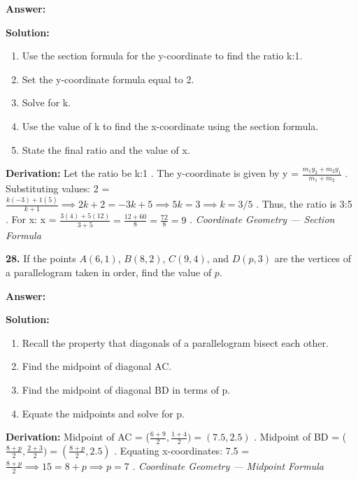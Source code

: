 \documentclass[12pt,a4paper]{exam}
\newcommand{\fitmath}[1]{%
  \sbox{\schmathbox}{$\displaystyle #1$}%
  \ifdim\wd\schmathbox>\linewidth
    \resizebox{\linewidth}{!}{\usebox{\schmathbox}}%
  \else
    \usebox{\schmathbox}%
  \fi}
\begin{document}
\begin{questions}
\textbf{Answer:}
\begin{center}
\fitmath{\text{Ratio is} 3:5, x = 9}
\end{center}

\textbf{Solution:}
\begin{enumerate}
  \item Use the section formula for the y-coordinate to find the ratio k:1.
  \item Set the y-coordinate formula equal to 2.
  \item Solve for k.
  \item Use the value of k to find the x-coordinate using the section formula.
  \item State the final ratio and the value of x.
\end{enumerate}
\textbf{Derivation:}
Let the ratio be  k:1 . The y-coordinate is given by  y = $\frac{m_1y_2 + m_2y_1}{m_1 + m_2}$ . Substituting values:  2 = $\frac{k(-3) + 1(5)}{k + 1} \implies 2k + 2 = -3k + 5 \implies 5k = 3 \implies k = 3/5$ . Thus, the ratio is  3:5 . For x:  x = $\frac{3(4) + 5(12)}{3 + 5} = \frac{12 + 60}{8} = \frac{72}{8} = 9$ .
\hfill \textit{Coordinate Geometry — Section Formula}
\vspace{0.3cm}

\question \textbf{28.} If the points $A(6, 1)$, $B(8, 2)$, $C(9, 4)$, and $D(p, 3)$ are the vertices of a parallelogram taken in order, find the value of $p$.

\textbf{Answer:}
\begin{center}
\fitmath{p = 7}
\end{center}

\textbf{Solution:}
\begin{enumerate}
  \item Recall the property that diagonals of a parallelogram bisect each other.
  \item Find the midpoint of diagonal AC.
  \item Find the midpoint of diagonal BD in terms of p.
  \item Equate the midpoints and solve for p.
\end{enumerate}
\textbf{Derivation:}
Midpoint of AC =  ($\frac{6+9}{2}, \frac{1+4}{2}) = (7.5, 2.5)$ . Midpoint of BD =  ($\frac{8+p}{2}, \frac{2+3}{2}) = (\frac{8+p}{2}, 2.5)$ . Equating x-coordinates:  7.5 = $\frac{8+p}{2} \implies 15 = 8 + p \implies p = 7$ .
\hfill \textit{Coordinate Geometry — Midpoint Formula}
\vspace{0.3cm}


\end{questions}
\end{document}
